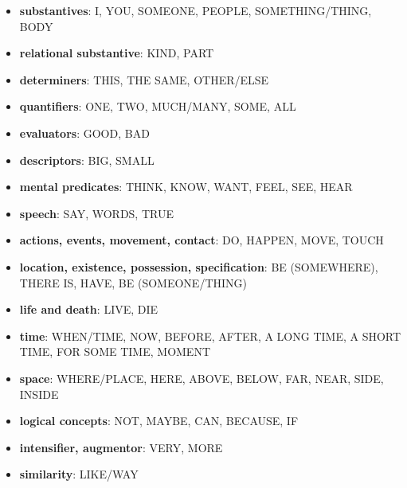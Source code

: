 \documentclass[headrule,footrule]{foils}
\begin{document}
\setlength{\columnsep}{1em}
\begin{multicols}{2} \small
\begin{itemize}
\item \textbf{substantives}: 
    I, YOU, SOMEONE, PEOPLE, SOMETHING/THING, BODY
\item \textbf{relational substantive}: 
    KIND, PART
\item \textbf{determiners}: 
    THIS, THE SAME, OTHER/ELSE
\item \textbf{quantifiers}: 
    ONE, TWO, MUCH/MANY, SOME, ALL
\item \textbf{evaluators}: 
    GOOD, BAD
\item \textbf{descriptors}: 
    BIG, SMALL
\item \textbf{mental predicates}: 
    THINK, KNOW, WANT, FEEL, SEE, HEAR
\item \textbf{speech}: 
    SAY, WORDS, TRUE
\item \textbf{actions, events, movement, contact}: 
    DO, HAPPEN, MOVE, TOUCH
\item \textbf{location, existence, possession, specification}: 
    BE (SOMEWHERE), THERE IS, HAVE, BE (SOMEONE/THING)
\item \textbf{life and death}: 
    LIVE, DIE
\item \textbf{time}: 
    WHEN/TIME, NOW, BEFORE, AFTER, A LONG TIME, A SHORT TIME, FOR SOME TIME, MOMENT
\item \textbf{space}: 
    WHERE/PLACE, HERE, ABOVE, BELOW, FAR, NEAR, SIDE, INSIDE
\item \textbf{logical concepts}: 
    NOT, MAYBE, CAN, BECAUSE, IF
\item \textbf{intensifier, augmentor}: 
    VERY, MORE
\item \textbf{similarity}: 
    LIKE/WAY 
  \end{itemize}
  \end{multicols}
\end{document}
